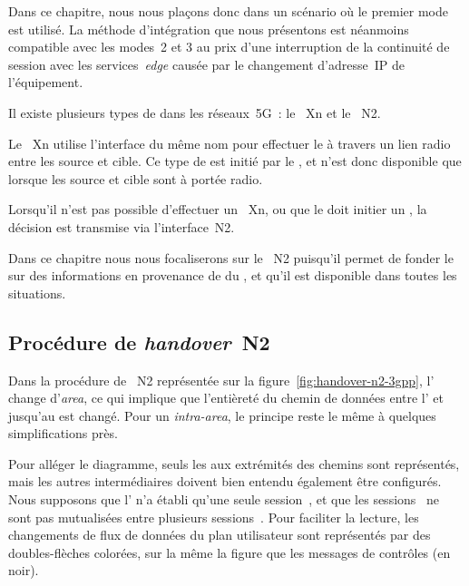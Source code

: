 \documentclass[../main.tex]{subfiles}
\begin{document}
Dans ce chapitre, nous nous plaçons donc dans un scénario où le premier mode est utilisé.
La méthode d’intégration que nous présentons est néanmoins compatible avec les modes~2 et 3 au prix d’une interruption de la continuité de session avec les services~\textit{edge} causée par le changement d’adresse~IP de l’équipement.

Il existe plusieurs types de  dans les réseaux~5G~\cite{3GPP.TS.23.502}: le ~Xn et le ~N2.

Le ~Xn utilise l’interface du même nom pour effectuer le  à travers un lien radio entre les  source et cible.
Ce type de  est initié par le , et n’est donc disponible que lorsque les  source et cible sont à portée radio.

Lorsqu’il n’est pas possible d’effectuer un ~Xn, ou que le  doit initier un , la décision est transmise via l’interface~N2.

Dans ce chapitre nous nous focaliserons sur le ~N2 puisqu’il permet de fonder le  sur des informations en provenance de  du , et qu’il est disponible dans toutes les situations.

\pagebreak
\subsection{Procédure de \textit{handover}~N2}
Dans la procédure de ~N2 représentée sur la figure~\ref{fig:handover-n2-3gpp}, l’ change d’\textit{area}, ce qui implique que l’entièreté du chemin de données entre l’ et jusqu’au  est changé.
Pour un  \textit{intra-area}, le principe reste le même à quelques simplifications près.

Pour alléger le diagramme, seuls les  aux extrémités des chemins sont représentés, mais les autres  intermédiaires doivent bien entendu également être configurés.
Nous supposons que l’ n’a établi qu’une seule session~, et que les sessions~ ne sont pas mutualisées entre plusieurs sessions~.
Pour faciliter la lecture, les changements de flux de données du plan utilisateur sont représentés par des doubles-flèches colorées, sur la même la figure que les messages de contrôles (en noir).
\end{document}
